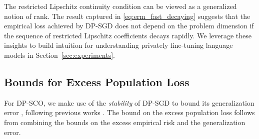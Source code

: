

The restricted Lipschitz continuity condition can be viewed as a generalized notion of rank.
The result captured in \eqref{eq:erm_fast_decaying} suggests that the empirical loss achieved by DP-SGD does not depend on the problem dimension if the sequence of restricted Lipschitz coefficients decays rapidly. 
We leverage these insights to build intuition for understanding privately fine-tuning language models in Section~\ref{sec:experiments}.


\subsection{Bounds for Excess Population Loss}
For DP-SCO, we make use of the \emph{stability} of DP-SGD to bound its generalization error \citep{BE02}, following previous works \citep{bassily2019private,BFGT20,song2021evading}.
The bound on the excess population loss follows from combining the bounds on the excess empirical risk and the generalization error.

